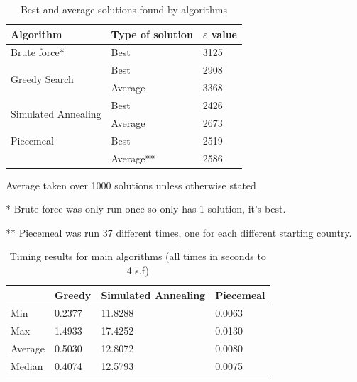 \documentclass[12pt]{report}
\begin{document}
\begin{table}[H]
\centering
\caption{Best and average solutions found by algorithms}
\label{solutionsFound}
\begin{tabular}{|l|l|l|}
\hline
Algorithm                            & Type of solution & $\varepsilon$ value \\ \hline
Brute force*                          & Best             & 3125                \\ \hline
\multirow{2}{*}{Greedy Search}        & Best             & 2908                \\ \cline{2-3} 
                                     & Average          & 3368                \\ \hline
\multirow{2}{*}{Simulated Annealing} & Best             & 2426                \\ \cline{2-3}
                                     & Average          & 2673                \\ \hline
Piecemeal                            & Best             & 2519                \\ \cline{2-3}
                                     & Average**          & 2586                \\ \hline
\end{tabular}
\end{table}
Average taken over 1000 solutions unless otherwise stated

* Brute force was only run once so only has 1 solution, it's best.

** Piecemeal was run 37 different times, one for each different starting country.

\begin{table}[H]
\centering
\caption{Timing results for main algorithms (all times in seconds to 4 s.f)}
\label{timing}
\begin{tabular}{|l|l|l|l|}
\hline
        & Greedy & Simulated Annealing & Piecemeal \\ \hline
Min     & 0.2377 & 11.8288             & 0.0063    \\ \hline
Max     & 1.4933 & 17.4252             & 0.0130    \\ \hline
Average & 0.5030 & 12.8072             & 0.0080    \\ \hline
Median  & 0.4074 & 12.5793             & 0.0075    \\ \hline
\end{tabular}
\end{table}

\clearpage
\renewcommand{\bibsection}{\section*{References}}
{}

\end{document}
